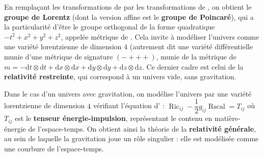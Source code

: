 \documentclass[12pt,a4paper]{article}
\DeclareMathOperator{\Ric}{Ric}
\DeclareMathOperator{\Rscal}{Rscal}
\theoremstyle{definition}
\begin{document}
\medskip

En remplaçant les transformations de  par les transformations de , on obtient le \textbf{groupe de Lorentz} (dont la version affine est le \textbf{groupe de Poincaré}), qui a la particularité d'être le groupe orthogonal de la forme quadratique $-t^2+x^2+y^2+z^2$, appelée métrique de . Cela invite à modéliser l'univers comme une variété lorentzienne de dimension $4$ (autrement dit une variété différentielle munie d'une métrique de signature $(-+++)$, munie de la métrique de  $m=-\mathrm{d}t\otimes\mathrm{d}t+\mathrm{d}x\otimes\mathrm{d}x+\mathrm{d}y\otimes\mathrm{d}y+\mathrm{d}z\otimes\mathrm{d}z$. Ce dernier cadre est celui de la \textbf{relativité restreinte}, qui correspond à un univers vide, sans gravitation.

\medskip

Dans le cas d'un univers avec gravitation, on modélise l'univers par une variété lorentzienne de dimension $4$ vérifiant l'équation d' : $\Ric_{ij}-\dfrac{1}{2}g_{ij}\Rscal=T_{ij}$ où $T_{ij}$ est le \textbf{tenseur énergie-impulsion}, représentant le contenu en matière-énergie de l'espace-temps. On obtient ainsi la théorie de la \textbf{relativité générale}, au sein de laquelle la gravitation joue un rôle singulier : elle est modélisée comme une courbure de l'espace-temps.
\newpage
\end{document}
